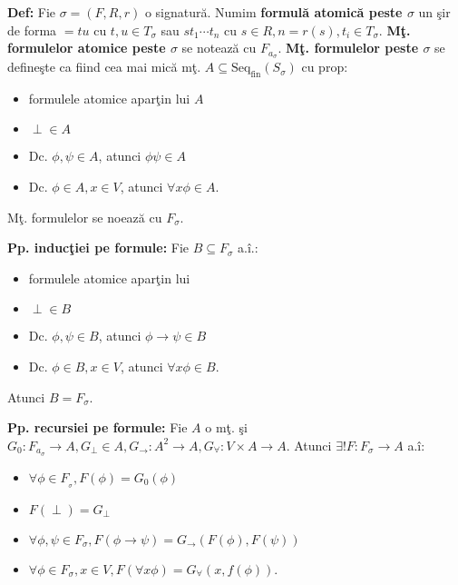 \documentclass{article}
\begin{document}
\textbf{Def:} Fie $\sigma=(F,R,r)$ o signatur\u a. Numim \textbf{formul\u a atomic\u a peste $\sigma$} un \c sir de forma $=tu$ cu $t,u\in T_\sigma$ sau $st_1\cdots t_n$ cu $s\in R,n=r(s),t_i\in T_\sigma$. \textbf{M\c t. formulelor atomice peste $\sigma$} se noteaz\u a cu $F_{a_\sigma}$. \textbf{M\c t. formulelor peste $\sigma$} se define\c ste ca fiind cea mai mic\u a m\c t. $A\subseteq \text{Seq}_\text{fin}(S_\sigma)$ cu prop:
\begin{itemize}
    \item formulele atomice apar\c tin lui $A$
    \item $\perp\in A$
    \item Dc. $\phi,\psi\in A$, atunci $\phi\psi\in A$
    \item Dc. $\phi\in A,x\in V$, atunci $\forall x\phi\in A$.
\end{itemize}
M\c t. formulelor se noeaz\u a cu $F_\sigma$.

\textbf{Pp. induc\c tiei pe formule:} Fie $B\subseteq F_\sigma$ a.\^ i.:
\begin{itemize}
    \item formulele atomice apar\c tin lui $\textbf{}$
    \item $\perp\in B$
    \item Dc. $\phi,\psi\in B$, atunci $\phi\rightarrow\psi\in B$
    \item Dc. $\phi\in B,x\in V$, atunci $\forall x\phi\in B$.
\end{itemize}
Atunci $B=F_\sigma$.

\textbf{Pp. recursiei pe formule:} Fie $A$ o m\c t. \c si $G_0:F_{a_\sigma}\rightarrow A,G_\perp\in A,G_\rightarrow:A^2\rightarrow A,G_\forall:V\times A\rightarrow A$. Atunci $\exists! F:F_\sigma\rightarrow A$ a.\^ i:
\begin{itemize}
    \item $\forall\phi\in F_{_\sigma},F(\phi)=G_0(\phi)$
    \item $F(\perp)=G_\perp$
    \item $\forall\phi,\psi\in F_\sigma,F(\phi\rightarrow\psi)=G_\rightarrow(F(\phi),F(\psi))$
    \item $\forall\phi\in F_\sigma,x\in V,F(\forall x\phi)=G_\forall(x,f(\phi))$.
\end{itemize}
\end{document}
